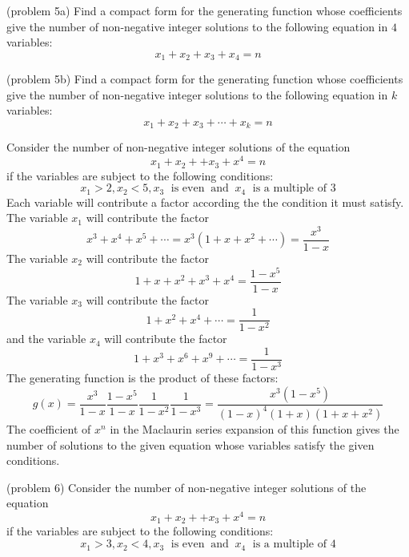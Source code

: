 \documentclass[handout]{ximera}
\begin{document}
\begin{problem}(problem 5a)
Find a compact form for the generating function whose coefficients give the number of non-negative integer solutions to the 
following equation in $4$ variables:
\[
x_1 + x_2 + x_3 + x_4 = n
\]
\end{problem}


\begin{problem}(problem 5b)
Find a compact form for the generating function whose coefficients give the number of non-negative integer solutions to the 
following equation in $k$ variables:
\[
x_1 + x_2 + x_3 + \cdots + x_k = n
\]
\end{problem}

\begin{example}[example 6]
Consider the number of non-negative integer solutions of the equation 
\[
x_1 + x_2 +  + x_3  + x^4 = n
\]
if the variables are subject to the following conditions:
\[
x_1 > 2, x_2 < 5, x_3 \; \text{ is even} \;\; \text{and} \;\; x_4 \; \text{ is a multiple of 3}
\]
Each variable will contribute a factor according the the condition it must satisfy.
The variable $x_1$ will contribute the factor 
\[
x^3 + x^4 + x^5 + \cdots = x^3(1 + x + x^2 + \cdots) = \frac{x^3}{1-x}
\]
The variable $x_2$ will contribute the factor 
\[
1+x+x^2 + x^3 + x^4 = \frac{1-x^5}{1-x}
\]
The variable $x_3$ will contribute the factor 
\[
1 +  x^2 + x^4 +  \cdots = \frac{1}{1-x^2}
\]
and the variable $x_4$ will contribute the factor 
\[
1 + x^3 + x^6 + x^9 + \cdots  = \frac{1}{1-x^3}
\]
The generating function is the product of these factors:
\[
g(x) = \frac{x^3}{1-x} \frac{1-x^5}{1-x} \frac{1}{1-x^2} \frac{1}{1-x^3} = \frac{x^3(1-x^5)}{(1-x)^4(1+x)(1+x+x^2)}
\]
The coefficient of $x^n$ in the Maclaurin series expansion of this function gives the number of solutions to 
the given equation whose variables satisfy the given conditions.

\end{example}


\begin{problem}(problem 6)
Consider the number of non-negative integer solutions of the equation 
\[
x_1 + x_2 +  + x_3  + x^4 = n
\]
if the variables are subject to the following conditions:
\[
x_1 > 3, x_2 < 4, x_3 \; \text{ is even} \;\; \text{and} \;\; x_4 \; \text{ is a multiple of 4}
\]
\begin{multipleChoice}
\\
\\
\end{multipleChoice}

\end{problem}
\end{document}
